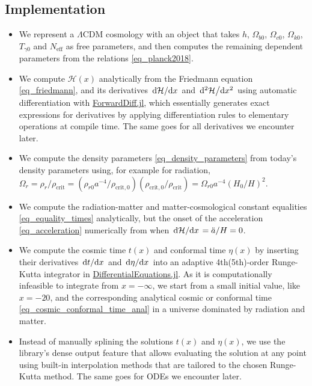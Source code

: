 \documentclass[10pt,a4paper]{article}
\begin{document}
\subsection{Implementation}
\label{sec_background_cosmology_implementation}

\begin{itemize}
	\item We represent a $\Lambda$CDM cosmology with an object that takes $h$, $\Omega_{b0}$, $\Omega_{c0}$, $\Omega_{k0}$, $T_{\gamma0}$ and $N_\text{eff}$ as free parameters,
	      and then computes the remaining dependent parameters from the relations \eqref{eq_planck2018}.
	\item We compute $\mathcal{H}(x)$ analytically from the Friedmann equation \eqref{eq_friedmann},
	      and its derivatives $\odv{\mathcal{H}}/{x}$ and $\odv[2]{\mathcal{H}}/{x}$ using automatic differentiation with \href{https://github.com/JuliaDiff/ForwardDiff.jl}{ForwardDiff.jl},
	      which essentially generates exact expressions for derivatives by applying differentiation rules to elementary operations at compile time.
	      The same goes for all derivatives we encounter later.
	\item We compute the density parameters \eqref{eq_density_parameters} from today's density parameters using, for example for radiation, $\Omega_r = \rho_r / \rho_\text{crit} = (\rho_{r0} a^{-4} / \rho_{\text{crit},0}) (\rho_{\text{crit},0} / \rho_\text{crit}) = \Omega_{r0} a^{-4} (H_0 / H)^2$.
	\item We compute the radiation-matter and matter-cosmological constant equalities \eqref{eq_equality_times} analytically,
	      but the onset of the acceleration \eqref{eq_acceleration} numerically from when $\odv{\mathcal{H}}/{x} = \ddot{a} / H = 0$.
	\item We compute the cosmic time $t(x)$ and conformal time $\eta(x)$ by inserting their derivatives $\odv{t}/{x}$ and $\odv{\eta}/{x}$ into an adaptive 4th(5th)-order Runge-Kutta integrator in \href{https://github.com/SciML/DifferentialEquations.jl}{DifferentialEquations.jl}.
	      As it is computationally infeasible to integrate from $x=-\infty$,
	      we start from a small initial value, like $x = -20$,
	      and the corresponding analytical cosmic or conformal time \eqref{eq_cosmic_conformal_time_anal} in a universe dominated by radiation and matter.
	\item Instead of manually splining the solutions $t(x)$ and $\eta(x)$,
	      we use the library's dense output feature that allows evaluating the solution at any point
	      using built-in interpolation methods that are tailored to the chosen Runge-Kutta method.
          The same goes for ODEs we encounter later.
\end{itemize}
\end{document}
